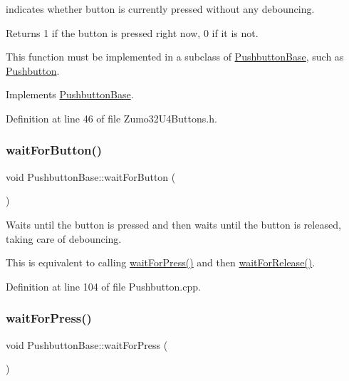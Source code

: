 indicates whether button is currently pressed without any debouncing. 

\begin{DoxyReturn}{Returns}
1 if the button is pressed right now, 0 if it is not.
\end{DoxyReturn}
This function must be implemented in a subclass of \hyperlink{class_pushbutton_base}{Pushbutton\+Base}, such as \hyperlink{class_pushbutton}{Pushbutton}. 

Implements \hyperlink{class_pushbutton_base_a5b11851f15413140b75e4574e773b6ae}{Pushbutton\+Base}.



Definition at line 46 of file Zumo32\+U4\+Buttons.\+h.

\mbox{\label{class_pushbutton_base_ab755065c930be0649597220316213e8a}} 
\subsubsection{\texorpdfstring{wait\+For\+Button()}{waitForButton()}}
{\footnotesize\ttfamily void Pushbutton\+Base\+::wait\+For\+Button (\begin{DoxyParamCaption}{ }\end{DoxyParamCaption})\hspace{0.3cm}{\ttfamily [inherited]}}



Waits until the button is pressed and then waits until the button is released, taking care of debouncing. 

This is equivalent to calling \hyperlink{class_pushbutton_base_a2e2787595c82ee0913ecf4c1eea4a2c8}{wait\+For\+Press()} and then \hyperlink{class_pushbutton_base_ae5fff34b3e1ebd62fd02b99edd6bf13a}{wait\+For\+Release()}. 

Definition at line 104 of file Pushbutton.\+cpp.

\mbox{\label{class_pushbutton_base_a2e2787595c82ee0913ecf4c1eea4a2c8}} 
\subsubsection{\texorpdfstring{wait\+For\+Press()}{waitForPress()}}
{\footnotesize\ttfamily void Pushbutton\+Base\+::wait\+For\+Press (\begin{DoxyParamCaption}{ }\end{DoxyParamCaption})\hspace{0.3cm}{\ttfamily [inherited]}}



